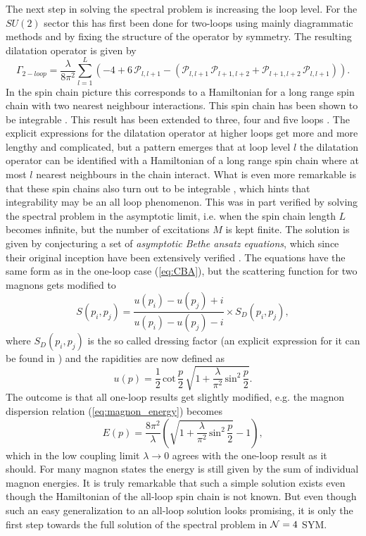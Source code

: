 The next step in solving the spectral problem is increasing the loop level. For the $SU(2)$ sector this has first been done for two-loops using mainly diagrammatic methods and by fixing the structure of the operator by symmetry. The resulting dilatation operator is given by \cite{su2_loops}
\begin{equation}
	\Gamma_{2-loop} = \frac{\lambda}{8\pi^2}\sum_{l=1}^L \left(-4 + 6 \, \mathcal{P}_{l,l+1} - \left( \mathcal{P}_{l,l+1} \, \mathcal{P}_{l+1,l+2} + \mathcal{P}_{l+1,l+2} \, \mathcal{P}_{l,l+1} \right) \right).
\end{equation}
In the spin chain picture this corresponds to a Hamiltonian for a long range spin chain with two nearest neighbour interactions. This spin chain has been shown to be integrable \cite{su2_loops}. This result has been extended to three, four and five loops \cite{beisert_all_loops}. The explicit expressions for the dilatation operator at higher loops get more and more lengthy and complicated, but a pattern emerges that at loop level $l$ the dilatation operator can be identified with a Hamiltonian of a long range spin chain where at most $l$ nearest neighbours in the chain interact. What is even more remarkable is that these spin chains also turn out to be integrable \cite{three_loops}, which hints that integrability may be an all loop phenomenon. This was in part verified by solving the spectral problem in the asymptotic limit, i.e. when the spin chain length $L$ becomes infinite, but the number of excitations $M$ is kept finite. The solution is given by conjecturing a set of \emph{asymptotic Bethe ansatz equations}, which since their original inception have been extensively verified \cite{aba_tests,aba_tests2}. The equations have the same form as in the one-loop case (\ref{eq:CBA}), but the scattering function for two magnons gets modified to \cite{dorey}
\begin{equation}
	S(p_i, p_j) = \frac{u(p_i) - u(p_j) + i}{u(p_i) - u(p_j) - i} \times S_D(p_i, p_j),
\end{equation}
where $S_D(p_i, p_j)$ is the so called dressing factor (an explicit expression for it can be found in \cite{dressing}) and the rapidities are now defined as
\begin{equation}
	u(p) = \frac{1}{2} \, \mathrm{cot} \, \frac{p}{2} \, \sqrt{1 + \frac{\lambda}{\pi^2} \, \mathrm{sin}^2 \, \frac{p}{2}}.
\end{equation}
The outcome is that all one-loop results get slightly modified, e.g. the magnon dispersion relation (\ref{eq:magnon_energy}) becomes
\begin{equation}
	E(p) = \frac{8\pi^2}{\lambda} \left( \sqrt{1 + \frac{\lambda}{\pi^2} \, \mathrm{sin}^2 \, \frac{p}{2}} - 1 \right),
	\label{eq:ABA_e}
\end{equation}  
which in the low coupling limit $\lambda \rightarrow 0$ agrees with the one-loop result as it should. For many magnon states the energy is still given by the sum of individual magnon energies. It is truly remarkable that such a simple solution exists even though the Hamiltonian of the all-loop spin chain is not known. But even though such an easy generalization to an all-loop solution looks promising, it is only the first step towards the full solution of the spectral problem in $\mathcal{N}=4$ SYM. 

